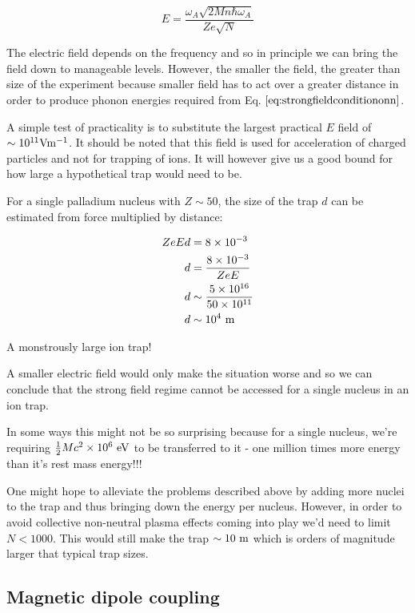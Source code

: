 \documentclass[
]{article}
\renewcommand{\[}{\begin{equation}}
\renewcommand{\]}{\end{equation}}
\begin{document}
\[
E = \frac{\omega_A \sqrt{2M n\hbar \omega_A}}{Ze \sqrt{N}} \label{eq:E}
\]

The electric field depends on the frequency and so in principle we can
bring the field down to manageable levels. However, the smaller the
field, the greater than size of the experiment because smaller field has
to act over a greater distance in order to produce phonon energies
required from Eq. \(\ref{eq:strongfieldconditiononn}\).

A simple test of practicality is to substitute the largest practical
\(E\) field of \(\sim 10^{11} \rm Vm^{-1}\). It should be noted that
this field is used for acceleration of charged particles and not for
trapping of ions. It will however give us a good bound for how large a
hypothetical trap would need to be.

For a single palladium nucleus with \(Z \sim 50\), the size of the trap
\(d\) can be estimated from force multiplied by distance:

\[
\begin{aligned}
ZeEd &= 8\times 10^{-3} \\
d  &= \frac{8\times 10^{-3}}{ZeE} \\
d  &\sim \frac{5\times 10^{16}}{50 \times 10^{11}} \\
d &\sim 10^4 \ \rm m
\end{aligned}
\]

A monstrously large ion trap!

A smaller electric field would only make the situation worse and so we
can conclude that the strong field regime cannot be accessed for a
single nucleus in an ion trap.

In some ways this might not be so surprising because for a single
nucleus, we're requiring \(\frac{1}{2}Mc^2\times 10^6 \ \rm eV\) to be
transferred to it - one million times more energy than it's rest mass
energy!!!

One might hope to alleviate the problems described above by adding more
nuclei to the trap and thus bringing down the energy per nucleus.
However, in order to avoid collective non-neutral plasma effects coming
into play we'd need to limit \(N < 1000\). This would still make the
trap \(\sim 10 \ \rm m\) which is orders of magnitude larger that
typical trap sizes.

\subsection{Magnetic dipole coupling}\label{magnetic-dipole-coupling}
\end{document}
